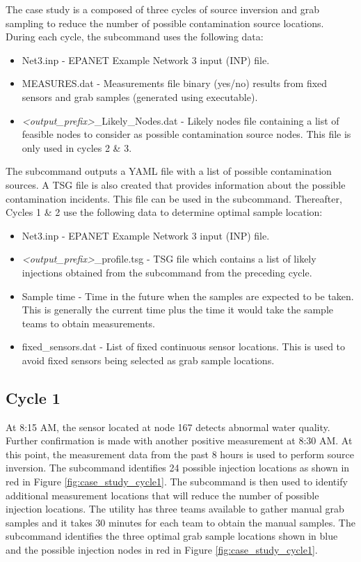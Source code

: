 The case study is a composed of three cycles of source inversion and grab sampling to reduce the number of possible contamination source 
locations. During each cycle, the  subcommand uses the following data:
\begin{itemize}
\item Net3.inp - EPANET Example Network 3 input (INP) file.
\item MEASURES.dat - Measurements file binary (yes/no) results from fixed sensors and grab samples (generated using  executable).
\item \textit{<output\_prefix>}\_Likely\_Nodes.dat - Likely nodes file containing a list of feasible nodes to consider as possible contamination source nodes. 
This file is only used in cycles 2 \& 3. 
\end{itemize}      
The  subcommand outputs a YAML file with a list of possible contamination sources. 
A TSG file is also created that provides information about the possible contamination incidents. This file 
can be used in the  subcommand. Thereafter, Cycles 1 \& 2 use the following data to determine optimal sample location:

\begin{itemize}
\item Net3.inp - EPANET Example Network 3 input (INP) file.
\item \textit{<output\_prefix>}\_profile.tsg - TSG file which contains a list of likely injections obtained 
from the  subcommand from the preceding cycle.
\item Sample time - Time in the future when the samples are expected to be taken. This is generally the current time 
plus the time it would take the sample teams to obtain measurements. 
\item fixed\_sensors.dat - List of fixed continuous sensor locations. This is used to avoid fixed sensors being selected
as grab sample locations.  

\end{itemize}

\subsection{Cycle 1}
At 8:15 AM, the sensor located at node 167 detects abnormal water quality. Further confirmation is made with another positive 
measurement at 8:30 AM. At this point, the measurement data from the past 8 hours is used to perform source inversion. 
The  subcommand identifies 24 possible injection locations as shown in red 
in Figure \ref{fig:case_study_cycle1}. The  subcommand is then used to identify additional measurement 
locations that will reduce the number of possible injection locations. 
The utility has three teams available to gather manual grab samples and it takes 30 minutes for each team to 
obtain the manual samples. The  subcommand identifies the three optimal grab sample locations 
shown in blue and the possible injection nodes in red in Figure \ref{fig:case_study_cycle1}.             

